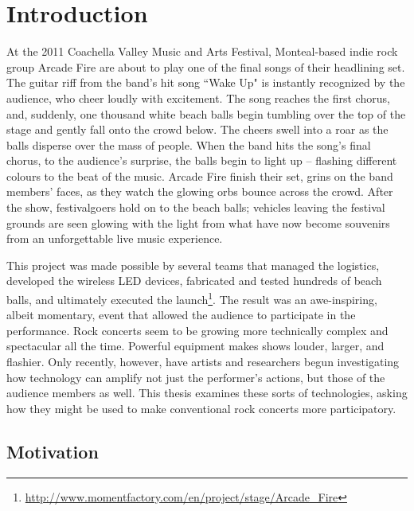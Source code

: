 \chapter{Introduction}

At the 2011 Coachella Valley Music and Arts Festival, Monteal-based indie rock group Arcade Fire are about to play one of the final songs of their headlining set. The guitar riff from the band's hit song ``Wake Up" is instantly recognized by the audience, who cheer loudly with excitement. The song reaches the first chorus, and, suddenly, one thousand white beach balls begin tumbling over the top of the stage and gently fall onto the crowd below. The cheers swell into a roar as the balls disperse over the mass of people. When the band hits the song's final chorus, to the audience's surprise, the balls begin to light up -- flashing different colours to the beat of the music. Arcade Fire finish their set, grins on the band members' faces, as they watch the glowing orbs bounce across the crowd. After the show, festivalgoers hold on to the beach balls; vehicles leaving the festival grounds are seen glowing with the light from what have now become souvenirs from an unforgettable live music experience.

This project was made possible by several teams that managed the logistics, developed the wireless LED devices, fabricated and tested hundreds of beach balls, and ultimately executed the launch\footnote{\url{http://www.momentfactory.com/en/project/stage/Arcade_Fire}}. The result was an awe-inspiring, albeit momentary, event that allowed the audience to participate in the performance. Rock concerts seem to be growing more technically complex and spectacular all the time. Powerful equipment makes shows louder, larger, and flashier. Only recently, however, have artists and researchers begun investigating how technology can amplify not just the performer's actions, but those of the audience members as well. This thesis examines these sorts of technologies, asking how they might be used to make conventional rock concerts more participatory.


\section{Motivation}

